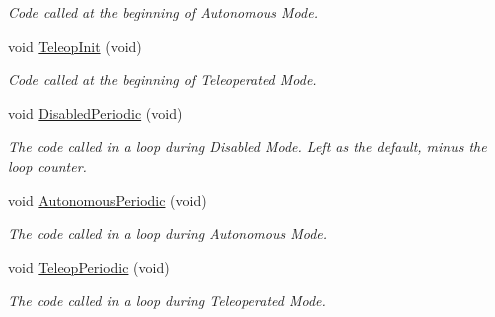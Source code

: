 \begin{DoxyCompactItemize}
\begin{DoxyCompactList}\small\item\em Code called at the beginning of Autonomous Mode. \item\end{DoxyCompactList}\item 
\hypertarget{class_builtin_default_code_ab3d70e0754e54bab03b130e6c042e0b5}{
void \hyperlink{class_builtin_default_code_ab3d70e0754e54bab03b130e6c042e0b5}{TeleopInit} (void)}
\label{class_builtin_default_code_ab3d70e0754e54bab03b130e6c042e0b5}

\begin{DoxyCompactList}\small\item\em Code called at the beginning of Teleoperated Mode. \item\end{DoxyCompactList}\item 
\hypertarget{class_builtin_default_code_a504e7d9b01a66635c31597f9a58cf478}{
void \hyperlink{class_builtin_default_code_a504e7d9b01a66635c31597f9a58cf478}{DisabledPeriodic} (void)}
\label{class_builtin_default_code_a504e7d9b01a66635c31597f9a58cf478}

\begin{DoxyCompactList}\small\item\em The code called in a loop during Disabled Mode. Left as the default, minus the loop counter. \item\end{DoxyCompactList}\item 
\hypertarget{class_builtin_default_code_a26da787e2abf683077e266ad44049ca0}{
void \hyperlink{class_builtin_default_code_a26da787e2abf683077e266ad44049ca0}{AutonomousPeriodic} (void)}
\label{class_builtin_default_code_a26da787e2abf683077e266ad44049ca0}

\begin{DoxyCompactList}\small\item\em The code called in a loop during Autonomous Mode. \item\end{DoxyCompactList}\item 
\hypertarget{class_builtin_default_code_a79dd68c3dba134d041413df30862aae2}{
void \hyperlink{class_builtin_default_code_a79dd68c3dba134d041413df30862aae2}{TeleopPeriodic} (void)}
\label{class_builtin_default_code_a79dd68c3dba134d041413df30862aae2}

\begin{DoxyCompactList}\small\item\em The code called in a loop during Teleoperated Mode. \item\end{DoxyCompactList}\end{DoxyCompactItemize}

